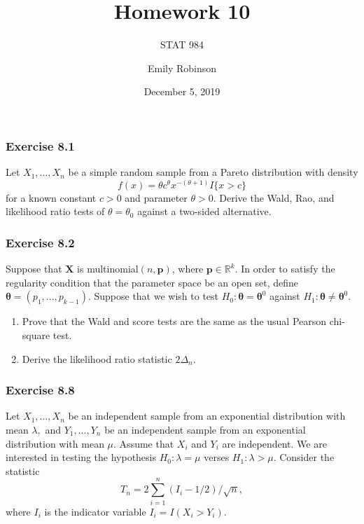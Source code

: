 \documentclass[12pt,]{article}
\title{Homework 10}
\subtitle{STAT 984}
\author{Emily Robinson}
\date{December 5, 2019}
\begin{document}
\maketitle

\hypertarget{exercise-8.1}{%
\subsubsection{Exercise 8.1}\label{exercise-8.1}}

Let \(X_1,...,X_n\) be a simple random sample from a Pareto distribution
with density \[f(x)=\theta c^\theta x^{-(\theta+1)}I\{x>c\}\] for a
known constant \(c>0\) and parameter \(\theta>0.\) Derive the Wald, Rao,
and likelihood ratio tests of \(\theta=\theta_0\) against a two-sided
alternative.

\hypertarget{exercise-8.2}{%
\subsubsection{Exercise 8.2}\label{exercise-8.2}}

Suppose that \(\boldsymbol{X}\) is multinomial\((n,\boldsymbol{p})\),
where \(\boldsymbol{p}\in\mathbb{R}^k\). In order to satisfy the
regularity condition that the parameter space be an open set, define
\(\boldsymbol\theta=(p_1,...,p_{k-1})\). Suppose that we wish to test
\(H_0:\boldsymbol\theta=\boldsymbol\theta^0\) against
\(H_1:\boldsymbol\theta\ne\boldsymbol\theta^0.\)

\begin{enumerate}
\def\labelenumi{(\alph{enumi})}
\item
  Prove that the Wald and score tests are the same as the usual Pearson
  chi-square test.
\item
  Derive the likelihood ratio statistic \(2\Delta_n\).
\end{enumerate}

\hypertarget{exercise-8.8}{%
\subsubsection{Exercise 8.8}\label{exercise-8.8}}

Let \(X_1,...,X_n\) be an independent sample from an exponential
distribution with mean \(\lambda,\) and \(Y_1,...,Y_n\) be an
independent sample from an exponential distribution with mean \(\mu.\)
Assume that \(X_i\) and \(Y_i\) are independent. We are interested in
testing the hypothesis \(H_0: \lambda = \mu\) verses
\(H_1: \lambda > \mu\). Consider the statistic
\[T_n=2\sum_{i=1}^n(I_i-1/2)/\sqrt{n},\] where \(I_i\) is the indicator
variable \(I_i=I(X_i>Y_i).\)
\end{document}
